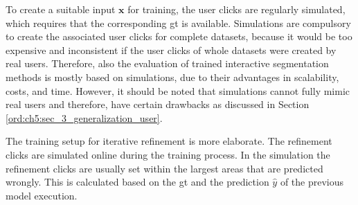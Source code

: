 To create a suitable input $\textbf{x}$ for training, the user clicks are regularly simulated, which requires that the corresponding \gls{gt} is available.
Simulations are compulsory to create the associated user clicks for complete datasets, because it would be too expensive and inconsistent if the user clicks of whole datasets were created by real users.
Therefore, also the evaluation of trained interactive segmentation methods is mostly based on simulations, due to their advantages in scalability, costs, and time.
However, it should be noted that simulations cannot fully mimic real users and therefore, have certain drawbacks as discussed in Section \ref{ord:ch5:sec_3_generalization_user}.

The training setup for iterative refinement is more elaborate.
The refinement clicks are simulated online during the training process.
In the simulation the refinement clicks are usually set within the largest areas that are predicted wrongly.
This is calculated based on the \gls{gt} and the prediction $\hat{y}$ of the previous model execution.

